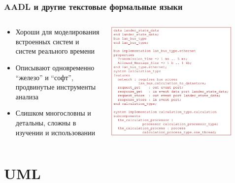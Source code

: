 \documentclass{../mcsslides}
\begin{document}
    \begin{frame}
        \frametitle{AADL и другие текстовые формальные языки}
        \begin{columns}
            \begin{column}{0.4\textwidth}
                \begin{small}
                    \begin{itemize}
                        \item Хороши для моделирования встроенных систем и систем реального времени
                        \item Описывают одновременно ``железо'' и ``софт'', продвинутые инструменты анализа
                        \item Слишком многословны и детальны, сложны в изучении и использовании
                    \end{itemize}
                \end{small}
            \end{column}
            \begin{column}{0.6\textwidth}
                \begin{center}
                    \includegraphics[width=0.85\textwidth]{aadl.png}
                \end{center}
            \end{column}
        \end{columns}
    \end{frame}

    \section{UML}
\end{document}
